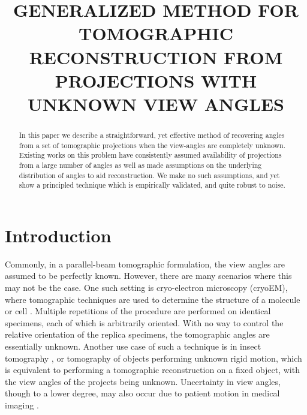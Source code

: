 \documentclass{article}
\title{GENERALIZED METHOD FOR TOMOGRAPHIC RECONSTRUCTION FROM PROJECTIONS WITH UNKNOWN VIEW ANGLES}
\begin{document}
%
\maketitle
%
\begin{abstract}
In this paper we describe a straightforward, yet effective method of recovering angles from a set of tomographic projections when the view-angles are completely unknown. Existing works on this problem have consistently assumed availability of projections from a large number of angles as well as made assumptions on the underlying distribution of angles to aid reconstruction. We make no such assumptions, and yet show a principled technique which is empirically validated, and quite robust to noise. 	
\end{abstract}
%
%
\section{Introduction}
\label{sec:intro}
Commonly, in a parallel-beam tomographic formulation, the view angles are assumed to be perfectly known. However, there are many scenarios where this may not be the case. One such setting is cryo-electron microscopy (cryoEM), where tomographic techniques are used to determine the structure of a molecule or cell \cite{Frank1996}. Multiple repetitions of the procedure are performed on identical specimens, each of which is arbitrarily oriented. With no way to control the relative orientation of the replica specimens, the tomographic angles are essentially unknown. Another use case of such a technique is in insect tomography \cite{Walker2014}, or tomography of objects performing unknown rigid motion, which is equivalent to performing a tomographic reconstruction on a fixed object, with the view angles of the projects being unknown. Uncertainty in view angles, though to a lower degree, may also occur due to patient motion in medical imaging \cite{Wood1995}. 
\end{document}
